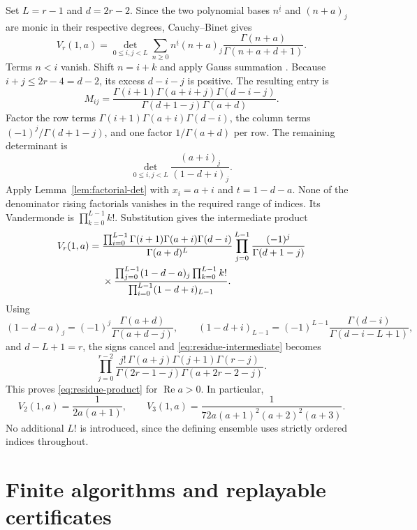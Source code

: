 \documentclass[11pt,letterpaper]{article}
\numberwithin{equation}{section}
\theoremstyle{definition}\newtheorem{definition}[theorem]{Definition}
\theoremstyle{remark}\newtheorem{remark}[theorem]{Remark}
\DeclareMathOperator{\Rea}{Re}
\newcommand{\fall}[2]{#1^{\underline{#2}}}
\begin{document}
Set $L=r-1$ and $d=2r-2$. Since the two polynomial bases
$\fall ni$ and $(n+a)_j$ are monic in their respective degrees,
Cauchy--Binet gives
\begin{equation}\label{eq:residue-mixed-moment}
 V_r(1,a)=\det_{0\le i,j<L}
 \sum_{n\ge0}\fall ni(n+a)_j
             \frac{\Gamma(n+a)}{\Gamma(n+a+d+1)}.
\end{equation}
Terms $n<i$ vanish. Shift $n=i+k$ and apply Gauss summation
\cite{dlmf:gauss}. Because $i+j\le2r-4=d-2$, its excess
$d-i-j$ is positive. The resulting entry is
\begin{equation}\label{eq:residue-entry}
 M_{ij}=\frac{\Gamma(i+1)\Gamma(a+i+j)\Gamma(d-i-j)}
                    {\Gamma(d+1-j)\Gamma(a+d)}.
\end{equation}
Factor the row terms $\Gamma(i+1)\Gamma(a+i)\Gamma(d-i)$,
the column terms $(-1)^j/\Gamma(d+1-j)$, and one factor
$1/\Gamma(a+d)$ per row. The remaining determinant is
\[
 \det_{0\le i,j<L}\frac{(a+i)_j}{(1-d+i)_j}.
\]
Apply Lemma~\ref{lem:factorial-det} with
$x_i=a+i$ and $t=1-d-a$. None of the denominator rising factorials
vanishes in the required range of indices. Its Vandermonde is
$\prod_{k=0}^{L-1}k!$. Substitution gives the intermediate product
\begin{align}
 V_r(1,a)={}&
 \frac{\prod_{i=0}^{L-1}\Gamma(i+1)\Gamma(a+i)\Gamma(d-i)}
      {\Gamma(a+d)^L}
 \prod_{j=0}^{L-1}\frac{(-1)^j}{\Gamma(d+1-j)}\notag\\
 &\times
 \frac{\prod_{j=0}^{L-1}(1-d-a)_j\prod_{k=0}^{L-1}k!}
      {\prod_{i=0}^{L-1}(1-d+i)_{L-1}}.
 \label{eq:residue-intermediate}
\end{align}
Using
\[
 (1-d-a)_j=(-1)^j\frac{\Gamma(a+d)}{\Gamma(a+d-j)},\qquad
 (1-d+i)_{L-1}=(-1)^{L-1}
       \frac{\Gamma(d-i)}{\Gamma(d-i-L+1)},
\]
and $d-L+1=r$, the signs cancel and
\eqref{eq:residue-intermediate} becomes
\[
 \prod_{j=0}^{r-2}
 \frac{j!\,\Gamma(a+j)\Gamma(j+1)\Gamma(r-j)}
       {\Gamma(2r-1-j)\Gamma(a+2r-2-j)}.
\]
This proves \eqref{eq:residue-product} for $\Rea a>0$. In particular,
\[
 V_2(1,a)=\frac1{2a(a+1)},\qquad
 V_3(1,a)=\frac1{72a(a+1)^2(a+2)^2(a+3)}.
\]
No additional $L!$ is introduced, since the defining ensemble uses
strictly ordered indices throughout.

\section{Finite algorithms and replayable certificates}
\label{app:algorithms}
\end{document}
